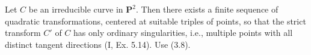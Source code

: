 Let $C$ be an irreducible curve in $\mathbf{P}^2$. Then there exists a finite sequence of quadratic transformations, centered at suitable triples of points, so that the strict transform $C'$ of $C$ has only ordinary singularities, i.e., multiple points with all distinct tangent directions (I, Ex. 5.14). Use (3.8).
